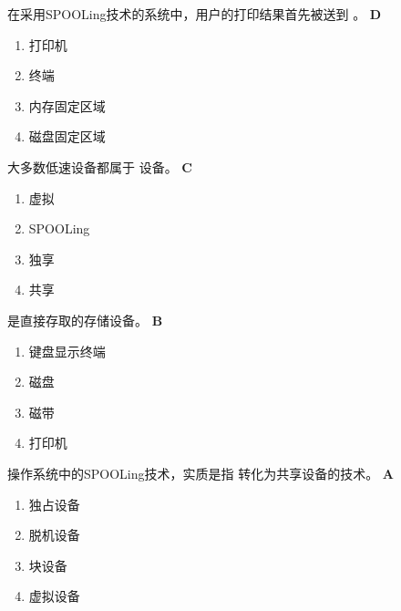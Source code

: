\begin{problem}
	在采用SPOOLing技术的系统中，用户的打印结果首先被送到 \myline。
	\textbf{D}
	\vspace{-0.5em}
	\begin{multicols}{4}
		\begin{enumerate}[label=\Alph*.]
			\item 打印机
			\item 终端
			\item 内存固定区域
			\item 磁盘固定区域
		\end{enumerate}
	\end{multicols}
	\vspace{-1em}
\end{problem}


\begin{problem}
	大多数低速设备都属于 \myline 设备。
	\textbf{C}
	\vspace{-0.5em}
	\begin{multicols}{4}
		\begin{enumerate}[label=\Alph*.]
			\item 虚拟
			\item SPOOLing
			\item 独享
			\item 共享
		\end{enumerate}
	\end{multicols}
	\vspace{-1em}
\end{problem}


\begin{problem}
	\myline 是直接存取的存储设备。
	\textbf{B}
	\vspace{-0.5em}
	\begin{multicols}{4}
		\begin{enumerate}[label=\Alph*.]
			\item 键盘显示终端
			\item 磁盘
			\item 磁带
			\item 打印机
		\end{enumerate}
	\end{multicols}
	\vspace{-1em}
\end{problem}


\begin{problem}
	操作系统中的SPOOLing技术，实质是指 \myline 转化为共享设备的技术。
	\textbf{A}
	\vspace{-0.5em}
	\begin{multicols}{4}
		\begin{enumerate}[label=\Alph*.]
			\item 独占设备
			\item 脱机设备
			\item 块设备
			\item 虚拟设备
		\end{enumerate}
	\end{multicols}
	\vspace{-1em}
\end{problem}


